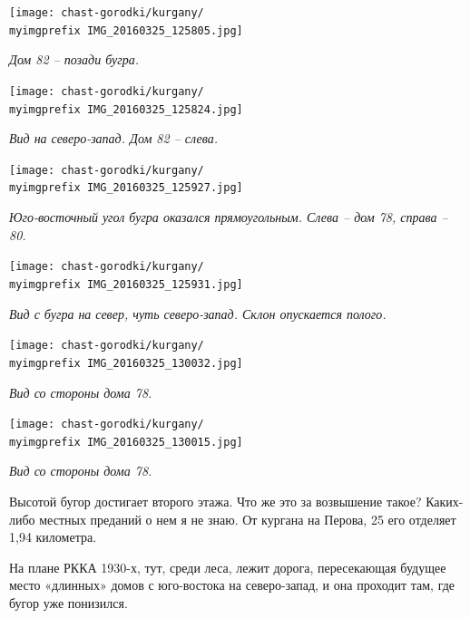 \newpage

\begin{center}
\texttt{[image: chast-gorodki/kurgany/\\myimgprefix IMG\_20160325\_125805.jpg]}

\textit{Дом 82 – позади бугра.}
\end{center}

\begin{center}
\texttt{[image: chast-gorodki/kurgany/\\myimgprefix IMG\_20160325\_125824.jpg]}

\textit{Вид на северо-запад. Дом 82 – слева.}
\end{center}

\newpage

\begin{center}
\texttt{[image: chast-gorodki/kurgany/\\myimgprefix IMG\_20160325\_125927.jpg]}

\textit{Юго-восточный угол бугра оказался прямоугольным. Слева – дом 78, справа – 80.}
\end{center}

\begin{center}
\texttt{[image: chast-gorodki/kurgany/\\myimgprefix IMG\_20160325\_125931.jpg]}

\textit{Вид с бугра на север, чуть северо-запад. Склон опускается полого.}
\end{center}

\newpage

\begin{center}
\texttt{[image: chast-gorodki/kurgany/\\myimgprefix IMG\_20160325\_130032.jpg]}

\textit{Вид со стороны дома 78.}
\end{center}

\begin{center}
\texttt{[image: chast-gorodki/kurgany/\\myimgprefix IMG\_20160325\_130015.jpg]}

\textit{Вид со стороны дома 78.}
\end{center}

\newpage

Высотой бугор достигает второго этажа. Что же это за возвышение такое? Каких-либо местных преданий о нем я не знаю. От кургана на Перова, 25 его отделяет 1,94 километра. 

На плане РККА 1930-х, тут, среди леса, лежит дорога, пересекающая будущее место «длинных» домов с юго-востока на северо-запад, и она проходит там, где бугор уже понизился.

